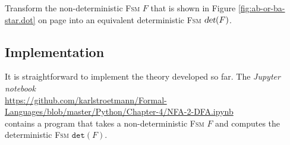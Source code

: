 \exerciseEng
Transform the non-deterministic \textsc{Fsm} $F$ that is shown in Figure \ref{fig:ab-or-ba-star.dot} on page
\pageref{fig:ab-or-ba-star.dot} 
into an equivalent deterministic \textsc{Fsm} $\textsl{det}(F)$. \eox

\subsection{Implementation}
It is straightforward to implement the theory developed so far. 
The \textsl{Jupyter notebook} 
\\[0.2cm]
\hspace*{0.3cm}
\href{https://github.com/karlstroetmann/Formal-Languages/blob/master/Python/Chapter-4/NFA-2-DFA.ipynb}{https://github.com/karlstroetmann/Formal-Languages/blob/master/Python/Chapter-4/NFA-2-DFA.ipynb}
\\[0.2cm]
contains a program that takes a non-deterministic \textsc{Fsm} $F$ and computes the deterministic \textsc{Fsm} $\mathtt{det}(F)$.
\pagebreak

